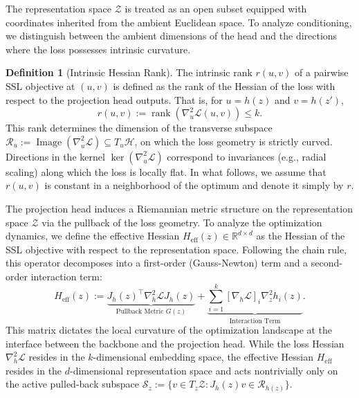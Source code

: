 \documentclass{article}
\theoremstyle{plain}
\theoremstyle{definition}
\newtheorem{definition}[theorem]{Definition}
\theoremstyle{remark}
\begin{document}
The representation space $\mathcal Z$ is treated as an open subset equipped with coordinates inherited from the ambient Euclidean space. To analyze conditioning, we distinguish between the ambient dimensions of the head and the directions where the loss possesses intrinsic curvature.

\begin{definition}[Intrinsic Hessian Rank]
\label{def:intrinsic-rank}
The intrinsic rank $r(u,v)$ of a pairwise SSL objective at $(u,v)$ is defined as the rank of the Hessian of the loss with respect to the projection head outputs. That is, for $u = h(z)$ and $v = h(z')$,
\begin{equation*}
    r(u,v) := \operatorname{rank}(\nabla_u^2 \mathcal L(u,v)) \le k.
\end{equation*}
This rank determines the dimension of the transverse subspace $\mathcal R_u := \operatorname{Image}(\nabla_u^2 \mathcal L)
\subseteq T_u \mathcal H$, on which the loss geometry is strictly curved. Directions in the kernel $\ker(\nabla_u^2 \mathcal L)$ correspond to invariances (e.g., radial scaling) along which the loss is locally flat. In what follows, we assume that $r(u,v)$ is constant in a neighborhood of the optimum and denote it simply by $r$.
\end{definition}

The projection head induces a Riemannian metric structure on the representation space $\mathcal{Z}$ via the pullback of the loss geometry. To analyze the optimization dynamics, we define the effective Hessian $H_{\text{eff}}(z) \in \mathbb{R}^{d \times d}$ as the Hessian of the SSL objective with respect to the representation space. Following the chain rule, this operator decomposes into a first-order (Gauss-Newton) term and a second-order interaction term:
\begin{equation}
    \label{eq:hessian-full}
    H_{\text{eff}}(z) := \underbrace{J_h(z)^\top \nabla_h^2 \mathcal{L} J_h(z)}_{\text{Pullback Metric } G(z)} + \underbrace{\sum_{i=1}^k [\nabla_h \mathcal{L}]_i \nabla_z^2  h_i(z)}_{\text{Interaction Term}}.
\end{equation}
This matrix dictates the local curvature of the optimization landscape at the interface between the backbone and the projection head. While the loss Hessian $\nabla_h^2 \mathcal{L}$ resides in the $k$-dimensional embedding space, the effective Hessian $H_{\text{eff}}$ resides in the $d$-dimensional representation space and acts nontrivially only on the active pulled-back subspace $\mathcal S_z := \{ v \in T_z \mathcal Z : J_h(z)v \in \mathcal R_{h(z)} \}$.
\end{document}
